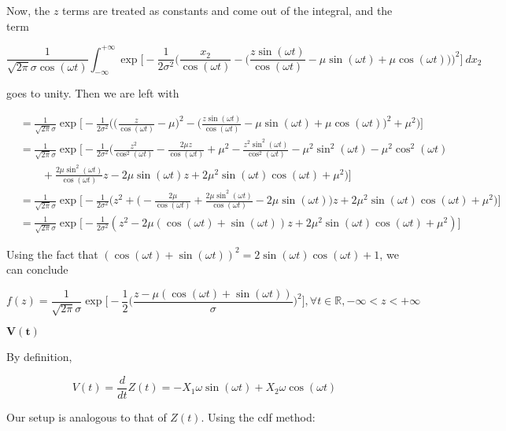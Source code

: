 \documentclass[10pt, oneside]{article}   	%
\theoremstyle{definition}
\begin{document}
\begin{enumerate}[label=9.\arabic*]
\begin{enumerate}
	Now, the $z$ terms are treated as constants and come out of the integral, and the term
	
	\[  \frac{1}{\sqrt{2\pi} \sigma \cos (\omega t)} \int^{+\infty}_{-\infty} \exp \bigg[ -\frac{1}{2 \sigma^2} \bigg( \frac{x_2}{\cos(\omega t)} - \bigg( \frac{z \sin(\omega t)}{\cos(\omega t)} - \mu \sin(\omega t) + \mu \cos(\omega t) \bigg) \bigg)^2 \bigg] \ dx_2 \]
	
	goes to unity. Then we are left with
	
	\begin{align*}
	&= \frac{1}{\sqrt{2\pi} \sigma } \exp \bigg[ -\frac{1}{2 \sigma^2} \bigg( \bigg( \frac{z}{\cos(\omega t)} - \mu \bigg)^2 - \bigg( \frac{z \sin (\omega t)}{\cos (\omega t)} - \mu \sin(\omega t) + \mu \cos(\omega t) \bigg)^2 + \mu^2 \bigg) \bigg] \\
	&= \frac{1}{\sqrt{2\pi} \sigma } \exp \bigg[ -\frac{1}{2 \sigma^2} \bigg( \frac{z^2}{\cos^2(\omega t)} - \frac{2\mu z}{\cos(\omega t)} + \mu^2 - \frac{z^2 \sin^2 (\omega t)}{\cos^2 (\omega t)} - \mu^2 \sin^2(\omega t) - \mu^2 \cos^2(\omega t) \\
	&\quad \quad + \frac{2\mu \sin^2(\omega t)}{\cos(\omega t)} z - 2\mu \sin(\omega t) z + 2\mu^2 \sin(\omega t) \cos(\omega t) + \mu^2 \bigg) \bigg] \\
	&=  \frac{1}{\sqrt{2\pi} \sigma } \exp \bigg[ -\frac{1}{2 \sigma^2} \bigg( z^2 + \bigg( - \frac{2\mu}{\cos(\omega t)} + \frac{2\mu \sin^2(\omega t)}{\cos(\omega t)} - 2\mu \sin(\omega t) \bigg) z + 2\mu^2 \sin(\omega t) \cos(\omega t) + \mu^2 \bigg) \bigg] \\
	&=  \frac{1}{\sqrt{2\pi} \sigma } \exp \bigg[ -\frac{1}{2 \sigma^2} ( z^2 - 2\mu (\cos(\omega t) + \sin(\omega t)) z + 2\mu^2 \sin(\omega t) \cos(\omega t) + \mu^2 ) \bigg]
	\end{align*}
	
	Using the fact that $(\cos(\omega t) + \sin(\omega t))^2 = 2 \sin(\omega t) \cos(\omega t) + 1$, we can conclude
	
	\[ \boxed{f(z) = \frac{1}{\sqrt{2\pi} \sigma} \exp \bigg[ -\frac{1}{2} \bigg( \frac{z - \mu(\cos(\omega t) + \sin(\omega t))}{\sigma} \bigg)^2  \bigg], \forall t \in \mathbb{R}, -\infty < z < +\infty } \]
	
	$\bm{V(t)}$
	
	By definition,
	
	\[ V(t) = \frac{d}{dt} Z(t) = -X_1 \omega \sin(\omega t) + X_2 \omega \cos(\omega t) \]
	
	Our setup is analogous to that of $Z(t)$. Using the cdf method:
	

\end{enumerate}
\end{enumerate}
\end{document}
